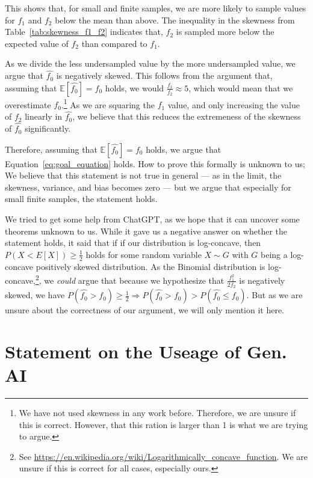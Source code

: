 \documentclass{article}
\begin{document}
This shows that, for small and finite samples, we are more likely to sample values for $f_1$ and $f_2$ below the mean than above. The inequality in the skewness from Table~\ref{tab:skewness_f1_f2} indicates that, $f_2$ is sampled more below the expected value of $f_2$ than compared to $f_1$.

As we divide the less undersampled value by the more undersampled value, we argue that $\hat{f_0}$ is negatively skewed. This follows from the argument that, assuming that $\mathbb{E}[\hat{f_0}] = f_0$ holds, we would $\frac{f_1}{f_2} \approx 5$, which would mean that we overestimate $f_0$.\!\footnote{We have not used skewness in any work before. Therefore, we are unsure if this is correct. However, that this ration is larger than 1 is what we are trying to argue.}
As we are squaring the $f_1$ value, and only increasing the value of $f_2$ linearly in $\hat{f_0}$, we believe that this reduces the extremeness of the skewness of $\hat{f_0}$ significantly.

Therefore, assuming that $\mathbb{E}\left[ \hat{f_0} \right] = f_0$ holds, we argue that Equation~\ref{eq:goal_equation} holds.
How to prove this formally is unknown to us; We believe that this statement is not true in general --- as in the limit, the skewness, variance, and bias becomes zero --- but we argue that especially for small finite samples, the statement holds.

We tried to get some help from ChatGPT, as we hope that it can uncover some theorems unknown to us. While it gave us a negative answer on whether the statement holds, it said that if if our distribution is log-concave, then $P(X < E[X]) \geq \frac{1}{2}$ holds for some random variable $X \sim G$ with $G$ being a log-concave positively skewed distribution.
As the Binomial distribution is log-concave,\!\footnote{See \url{https://en.wikipedia.org/wiki/Logarithmically_concave_function}. We are unsure if this is correct for all cases, especially ours.}, we \textit{could} argue that because we hypothesize that $\frac{f_1^2}{2f_2}$ is negatively skewed, we have $P(\hat{f_0} > f_0) \geq \frac{1}{2}\Rightarrow P(\hat{f_0} > f_0) > P(\hat{f_0} \leq f_0)$. But as we are unsure about the correctness of our argument, we will only mention it here.






\pagebreak
\section*{Statement on the Useage of Gen. AI}
\end{document}
